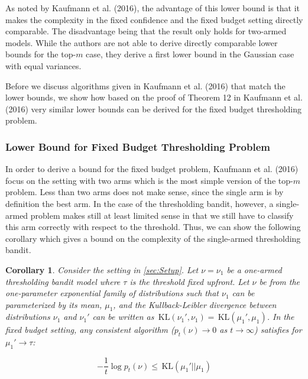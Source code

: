 \documentclass[11pt,]{article}
\newtheorem{corollary}{Corollary}
\newcommand{\KL}{\,\text{KL}}
\begin{document}
As noted by Kaufmann et al. (2016), the advantage of this lower bound is
that it makes the complexity in the fixed confidence and the fixed
budget setting directly comparable. The disadvantage being that the
result only holds for two-armed models. While the authors are not able
to derive directly comparable lower bounds for the top-\(m\) case, they
derive a first lower bound in the Gaussian case with equal variances.

Before we discuss algorithms given in Kaufmann et al. (2016) that match
the lower bounds, we show how based on the proof of Theorem 12 in
Kaufmann et al. (2016) very similar lower bounds can be derived for the
fixed budget thresholding problem.

\subsubsection{\texorpdfstring{Lower Bound for Fixed Budget Thresholding
Problem
\label{sec:LBTBP}}{Lower Bound for Fixed Budget Thresholding Problem }}\label{lower-bound-for-fixed-budget-thresholding-problem}

In order to derive a bound for the fixed budget problem, Kaufmann et al.
(2016) focus on the setting with two arms which is the most simple
version of the top-\(m\) problem. Less than two arms does not make
sense, since the single arm is by definition the best arm. In the case
of the thresholding bandit, however, a single-armed problem makes still
at least limited sense in that we still have to classify this arm
correctly with respect to the threshold. Thus, we can show the following
corollary which gives a bound on the complexity of the single-armed
thresholding bandit.

\begin{corollary}
Consider the setting in \autoref{sec:Setup}. Let $\nu = \nu_1$ be a one-armed thresholding bandit model where $\tau$ is the threshold fixed upfront. Let $\nu$ be from the one-parameter exponential family of distributions such that $\nu_1$ can be parameterized by its mean, $\mu_1$, and the Kullback-Leibler divergence between distributions $\nu_1$ and $\nu_1'$ can be written as $\KL(\nu_1', \nu_1) = \KL(\mu_1', \mu_1)$. In the fixed budget setting, any consistent algorithm ($p_t(\nu) \rightarrow 0$ as $t \rightarrow \infty$) satisfies for $\mu_1' \rightarrow \tau$:

$$
- \frac{1}{t} \log p_t(\nu) \leq \KL(\mu_1' || \mu_1)
$$
\end{corollary}
\end{document}
